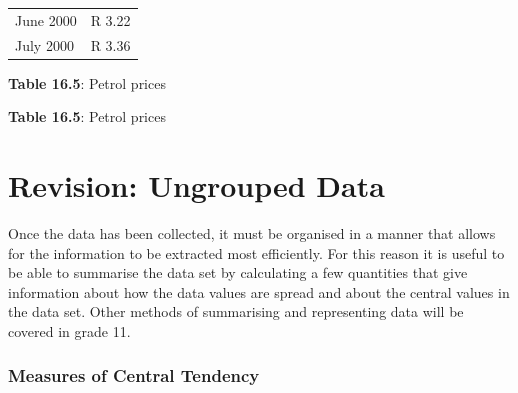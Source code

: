 \begin{description}[noitemsep]
\begin{description}[noitemsep]
\begin{table}[H]
\begin{center}
\begin{xtabular}[t]{|l|l|}
        June 2000 &
        R 3.22%
     \tabularnewline{}
        July 2000 &
        R 3.36%
     \tabularnewline{}
    \end{xtabular}
      \end{center}
    \begin{center}{\small\bfseries Table 16.5}: Petrol prices\end{center}
    \begin{caption}{\small\bfseries Table 16.5}: Petrol prices\end{caption}
\end{table}
    \par
    \label{m39403*cid5}
% 
%     
%     
%     
%     
    \label{m39400*cid7}
            \section{Revision: Ungrouped Data}
            \nopagebreak
      \label{m39400*id211153}Once the data has been collected, it must be organised in a manner that allows for the information to be extracted most efficiently. For this reason it is useful to be able to summarise the data set by calculating a few quantities that give information about how the data values are spread and about the central values in the data set. Other methods of summarising and representing data will be covered in grade 11.\par 
      \label{m39400*uid59}
            \subsubsection{ Measures of Central Tendency}
            \nopagebreak
        \label{m39400*uid60}

\end{description}
\end{description}
